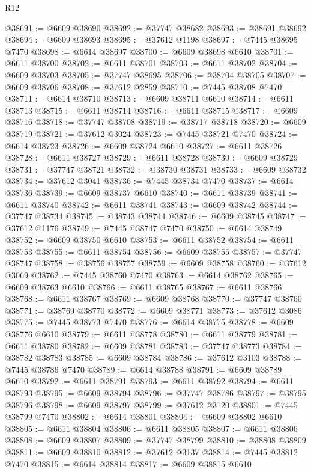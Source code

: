 \begin{lexlean}{R12}
\begin{coremodule}
@38691 := @6609 @38690
@38692 := @37747 @38682
@38693 := @38691 @38692
@38694 := @6609 @38693
@38695 := @37612 @1198
@38697 := @7445 @38695 @7470
@38698 := @6614 @38697
@38700 := @6609 @38698 @6610
@38701 := @6611 @38700
@38702 := @6611 @38701
@38703 := @6611 @38702
@38704 := @6609 @38703
@38705 := @37747 @38695
@38706 := @38704 @38705
@38707 := @6609 @38706
@38708 := @37612 @2859
@38710 := @7445 @38708 @7470
@38711 := @6614 @38710
@38713 := @6609 @38711 @6610
@38714 := @6611 @38713
@38715 := @6611 @38714
@38716 := @6611 @38715
@38717 := @6609 @38716
@38718 := @37747 @38708
@38719 := @38717 @38718
@38720 := @6609 @38719
@38721 := @37612 @3024
@38723 := @7445 @38721 @7470
@38724 := @6614 @38723
@38726 := @6609 @38724 @6610
@38727 := @6611 @38726
@38728 := @6611 @38727
@38729 := @6611 @38728
@38730 := @6609 @38729
@38731 := @37747 @38721
@38732 := @38730 @38731
@38733 := @6609 @38732
@38734 := @37612 @3041
@38736 := @7445 @38734 @7470
@38737 := @6614 @38736
@38739 := @6609 @38737 @6610
@38740 := @6611 @38739
@38741 := @6611 @38740
@38742 := @6611 @38741
@38743 := @6609 @38742
@38744 := @37747 @38734
@38745 := @38743 @38744
@38746 := @6609 @38745
@38747 := @37612 @1176
@38749 := @7445 @38747 @7470
@38750 := @6614 @38749
@38752 := @6609 @38750 @6610
@38753 := @6611 @38752
@38754 := @6611 @38753
@38755 := @6611 @38754
@38756 := @6609 @38755
@38757 := @37747 @38747
@38758 := @38756 @38757
@38759 := @6609 @38758
@38760 := @37612 @3069
@38762 := @7445 @38760 @7470
@38763 := @6614 @38762
@38765 := @6609 @38763 @6610
@38766 := @6611 @38765
@38767 := @6611 @38766
@38768 := @6611 @38767
@38769 := @6609 @38768
@38770 := @37747 @38760
@38771 := @38769 @38770
@38772 := @6609 @38771
@38773 := @37612 @3086
@38775 := @7445 @38773 @7470
@38776 := @6614 @38775
@38778 := @6609 @38776 @6610
@38779 := @6611 @38778
@38780 := @6611 @38779
@38781 := @6611 @38780
@38782 := @6609 @38781
@38783 := @37747 @38773
@38784 := @38782 @38783
@38785 := @6609 @38784
@38786 := @37612 @3103
@38788 := @7445 @38786 @7470
@38789 := @6614 @38788
@38791 := @6609 @38789 @6610
@38792 := @6611 @38791
@38793 := @6611 @38792
@38794 := @6611 @38793
@38795 := @6609 @38794
@38796 := @37747 @38786
@38797 := @38795 @38796
@38798 := @6609 @38797
@38799 := @37612 @3120
@38801 := @7445 @38799 @7470
@38802 := @6614 @38801
@38804 := @6609 @38802 @6610
@38805 := @6611 @38804
@38806 := @6611 @38805
@38807 := @6611 @38806
@38808 := @6609 @38807
@38809 := @37747 @38799
@38810 := @38808 @38809
@38811 := @6609 @38810
@38812 := @37612 @3137
@38814 := @7445 @38812 @7470
@38815 := @6614 @38814
@38817 := @6609 @38815 @6610

\end{coremodule}
\end{lexlean}
